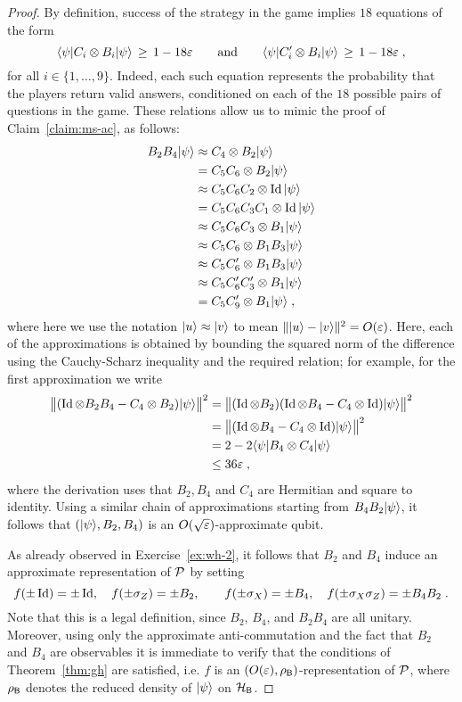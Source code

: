 \begin{proof}
By definition, success of the strategy in the game implies $18$ equations of the form 
\begin{equation}\label{eq:ms-bc-1}
 \langle\psi| C_i \otimes B_i |\psi\rangle \,\geq \, 1-18\varepsilon\qquad\text{and}\qquad \langle\psi| C'_i \otimes B_i |\psi\rangle \,\geq \, 1-18\varepsilon\;,
\end{equation}
for all $i\in \{1,\ldots,9\}$. Indeed, each such equation represents the probability that the players return valid answers, conditioned on each of the $18$ possible pairs of questions in the game. These relations allow us to mimic the proof of Claim~\ref{claim:ms-ac}, as follows: 
\begin{align*}
B_2 B_4 |\psi\rangle & \approx C_4 \otimes B_2 |\psi\rangle\\
&= C_5 C_6 \otimes B_2 |\psi\rangle\\
&\approx C_5 C_6 C_2 \otimes \mathop{\rm Id}\nolimits |\psi\rangle\\
&= C_5 C_6 C_3 C_1 \otimes \mathop{\rm Id}\nolimits |\psi\rangle\\
&\approx C_5C_6C_3 \otimes B_1 |\psi\rangle\\
&\approx C_5C_6\otimes B_1 B_3 |\psi\rangle\\
&\approx C_5C'_6\otimes B_1 B_3 |\psi\rangle\\
&\approx C_5C'_6 C'_3\otimes B_1  |\psi\rangle\\
&=  C_5C'_9\otimes B_1  |\psi\rangle\;,
\end{align*}
where here we use the notation $|u\rangle\approx |v\rangle$ to mean $\||u\rangle - |v\rangle\|^2 = O(\varepsilon)$. Here, each of the approximations is obtained by bounding the squared norm of the difference using the Cauchy-Scharz inequality and the required relation; for example, for the first approximation we write
\begin{align*}
 \big\|(\mathop{\rm Id}\nolimits \otimes B_2 B_4 - C_4 \otimes B_2)|\psi\rangle\big\|^2
&= \big\|(\mathop{\rm Id}\nolimits \otimes B_2)(\mathop{\rm Id}\nolimits\otimes B_4 - C_4 \otimes \mathop{\rm Id}\nolimits)|\psi\rangle\big\|^2\\
&= \big\|(\mathop{\rm Id}\nolimits\otimes B_4 - C_4 \otimes \mathop{\rm Id}\nolimits)|\psi\rangle\big\|^2\\ 
&= 2 - 2 \langle\psi| B_4 \otimes C_4 |\psi\rangle \\
& \leq 36\varepsilon\;,
\end{align*}
where the derivation uses that $B_2,B_4$ and $C_4$ are Hermitian and square to identity. 
Using a similar chain of approximations starting from $B_4 B_2 |\psi\rangle$, it follows that $(|\psi\rangle,B_2,B_4)$ is an $O(\sqrt{\varepsilon})$-approximate qubit.
 
As already observed in Exercise~\ref{ex:wh-2}, it follows that $B_2$ and $B_4$ induce an approximate representation of $\mathcal{P}$ by setting 
$$ f(\pm \mathop{\rm Id}\nolimits)=\pm\mathop{\rm Id}\nolimits,\quad f(\pm\sigma_Z)=\pm B_2,\quad\quad f(\pm\sigma_X)=\pm B_4,\quad f(\pm\sigma_X\sigma_Z) = \pm B_4B_2\;.$$
Note that this is a legal definition, since $B_2$, $B_4$, and $B_2B_4$ are all unitary. Moreover, using only the approximate anti-commutation and the fact that $B_2$ and $B_4$ are observables it is immediate to verify that the conditions of Theorem~\ref{thm:gh} are satisfied, i.e. $f$ is an $(O({\varepsilon}),\rho_{\textsf{B}})$-representation of $\mathcal{P}$, where $\rho_{\textsf{B}}$ denotes the reduced density of $|\psi\rangle$ on $\mathcal{H}_{\textsf{B}}$.  


\end{proof}
